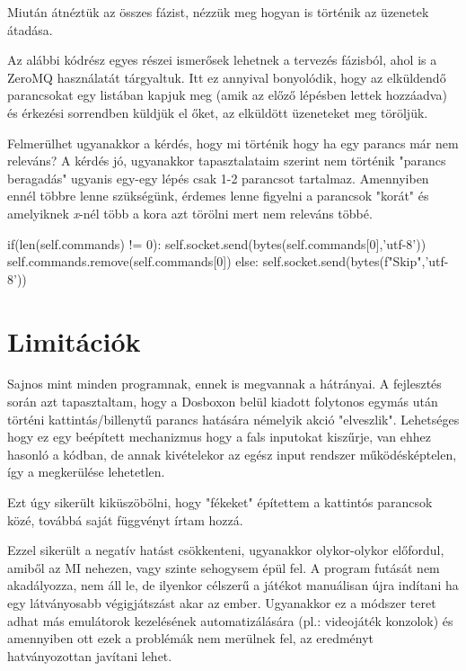 Miután átnéztük az összes fázist, nézzük meg hogyan is történik az üzenetek átadása.

Az alábbi kódrész egyes részei ismerősek lehetnek a tervezés fázisból, ahol is a ZeroMQ használatát tárgyaltuk. Itt ez annyival bonyolódik, hogy az elküldendő parancsokat egy listában kapjuk meg (amik az előző lépésben lettek hozzáadva) és érkezési sorrendben küldjük el őket, az elküldött üzeneteket meg töröljük.

Felmerülhet ugyanakkor a kérdés, hogy mi történik hogy ha egy parancs már nem releváns? A kérdés jó, ugyanakkor tapasztalataim szerint nem történik "parancs beragadás" ugyanis egy-egy lépés csak 1-2 parancsot tartalmaz. Amennyiben ennél többre lenne szükségünk, érdemes lenne figyelni a parancsok "korát" és amelyiknek \textit{x}-nél több a kora azt törölni mert nem releváns többé.

\begin{python}
if(len(self.commands) != 0):
    self.socket.send(bytes(self.commands[0],'utf-8'))
    self.commands.remove(self.commands[0])
else:
    self.socket.send(bytes(f"Skip",'utf-8'))
\end{python}

\section{Limitációk}

Sajnos mint minden programnak, ennek is megvannak a hátrányai. A fejlesztés során azt tapasztaltam, hogy a Dosboxon belül kiadott folytonos egymás után történi kattintás/billenytű parancs hatására némelyik akció "elveszlik". Lehetséges hogy ez egy beépített mechanizmus hogy a fals inputokat kiszűrje, van ehhez hasonló a kódban, de annak kivételekor az egész input rendszer működésképtelen, így a megkerülése lehetetlen.

Ezt úgy sikerült kiküszöbölni, hogy "fékeket" építettem a kattintós parancsok közé, továbbá saját függvényt írtam hozzá.

Ezzel sikerült a negatív hatást csökkenteni, ugyanakkor olykor-olykor előfordul, amiből az MI nehezen, vagy szinte sehogysem épül fel. A program futását nem akadályozza, nem áll le, de ilyenkor célszerű a játékot manuálisan újra indítani ha egy látványosabb végigjátszást akar az ember. Ugyanakkor ez a módszer teret adhat más emulátorok kezelésének automatizálására (pl.: videojáték konzolok) és amennyiben ott ezek a problémák nem merülnek fel, az eredményt hatványozottan javítani lehet.